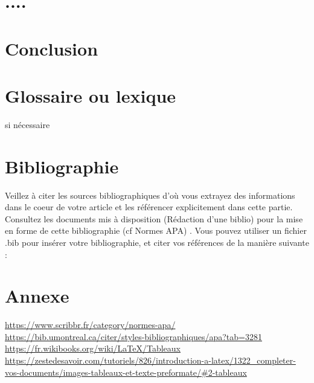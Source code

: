 \documentclass[a4paper,12pt]{article}
\begin{document}

\section{....}

\section{Conclusion}

\section{Glossaire ou lexique}

si nécessaire

\section{Bibliographie}

Veillez à citer les sources bibliographiques d’où vous extrayez des informations dans le coeur de votre article et les référencer explicitement dans cette partie.
Consultez les documents mis à disposition (Rédaction d’une biblio) pour la
mise en forme de cette bibliographie (cf Normes APA) \cite{apa_scribbr} \cite{apa_umontreal}.
Vous pouvez utiliser un fichier .bib pour insérer votre bibliographie, et
citer vos références de la manière suivante : \cite{Gre93}

\section{Annexe}

\begin{thebibliography}{REF}
    \url{https://www.scribbr.fr/category/normes-apa/}
    \url{https://bib.umontreal.ca/citer/styles-bibliographiques/apa?tab=3281} 
    \url{https://fr.wikibooks.org/wiki/LaTeX/Tableaux}
    \url{https://zestedesavoir.com/tutoriels/826/introduction-a-latex/1322_completer-vos-documents/images-tableaux-et-texte-preformate/#2-tableaux}
\end{thebibliography}
\end{document}
